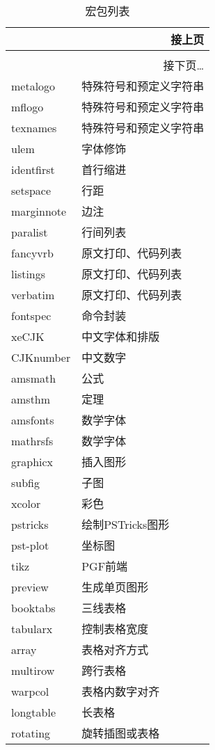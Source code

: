 \begin{longtable}{ll}
    \multicolumn{2}{r}{接上页} \\
    \toprule
    \endhead
\caption{宏包列表} \\
    \toprule
    \endfirsthead
    \bottomrule
    \multicolumn{2}{r}{接下页\dots} \\
    \endfoot
    \bottomrule
    \endlastfoot
    metalogo & 特殊符号和预定义字符串 \\
    mflogo & 特殊符号和预定义字符串 \\
    texnames & 特殊符号和预定义字符串 \\
    ulem & 字体修饰 \\
    identfirst & 首行缩进 \\
    setspace & 行距 \\
    marginnote & 边注 \\
    paralist & 行间列表 \\
    fancyvrb & 原文打印、代码列表 \\
    listings & 原文打印、代码列表 \\
    verbatim & 原文打印、代码列表 \\
    \midrule
    fontspec & \XeTeX{}命令封装 \\
    xeCJK & 中文字体和排版 \\
    CJKnumber & 中文数字 \\
    \midrule
    amsmath & 公式 \\
    amsthm & 定理 \\
    amsfonts & 数学字体 \\
    mathrsfs & 数学字体 \\
    \midrule
    graphicx & 插入图形 \\
    subfig & 子图 \\
    xcolor & 彩色 \\
    pstricks & 绘制PSTricks图形 \\
    pst-plot & 坐标图 \\
    tikz & PGF前端 \\
    preview & 生成单页图形 \\
    \midrule
    booktabs & 三线表格 \\
    tabularx & 控制表格宽度 \\
    array & 表格对齐方式 \\
    multirow & 跨行表格 \\
    warpcol & 表格内数字对齐 \\
    longtable & 长表格 \\
    rotating & 旋转插图或表格 \\

\end{longtable}
